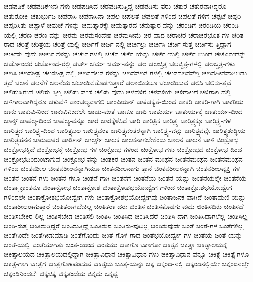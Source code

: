{ಚಡಪಡಿಕೆ
ಚಡಪಡಿಕೆಇವು-ಗಳು
ಚಡಪಡಿಸಿದ
ಚಡಪಡಿಸುತ್ತಿದ್ದ
ಚಡಪಡಿಸು-ವರು
ಚತುರ
ಚತುರನಾಗಿದ್ದರೂ
ಚತುರೋಕ್ತಿ
ಚತುರ್ಭುಜ
ಚಪರಾಸಿ
ಚಪರಾಸಿನಾ
ಚಪಲ
ಚಪಲತೆ
ಚಪಲತೆ-ಗಳಿಂದ
ಚಪಲತೆ-ಗಳಿಗೆ
ಚಪ್ಪಟೆ
ಚಪ್ಪರಿ
ಚಪ್ಪರಿಸಿತು
ಚಪ್ಪಾಳೆ
ಚಮಚೆ-ಗಳನ್ನು
ಚಮತ್ಕಾರಕ್ಕೇ
ಚಮತ್ಕಾರದ
ಚಮತ್ಕಾರ-ವನ್ನು
ಚರಂಡಿಗೆ
ಚರಂಡಿಯ
ಚರಂಡಿ-ಯಲ್ಲಿ
ಚರಣ
ಚರಣ-ವನ್ನು
ಚರಮ
ಚರಮಸಂದೇಶ
ಚರಮಸೀಮೆ
ಚರ-ವಾದ
ಚರಾಚರ
ಚರಾಚರಭೂತ-ಗಳ
ಚರಿತ-ರಾದ
ಚರಿತ್ರೆ
ಚರಿತ್ರೆಯ
ಚರಿತ್ರೆ-ಯಲ್ಲಿ
ಚರ್ಚಿಗೆ
ಚರ್ಚಿ-ನಲ್ಲಿ
ಚರ್ಚಿಲ್ರು
ಚರ್ಚಿಸಿ
ಚರ್ಚಿ-ಸುತ್ತ
ಚರ್ಚಿಸು-ತ್ತಿದ್ದಾಗ
ಚರ್ಚಿಸು-ವುದು
ಚರ್ಚು-ಗಳನ್ನು
ಚರ್ಚು-ಗಳಲ್ಲಿ
ಚರ್ಚೆ
ಚರ್ಚೆ-ಯನ್ನು
ಚರ್ಚೆ-ಯಲ್ಲಿ
ಚರ್ಚೆ-ಯಿಂದ
ಚರ್ಚೊಂದನ್ನು
ಚರ್ಚೊಂದರ
ಚರ್ಚೊಂದ-ರಲ್ಲಿ
ಚರ್ಚ್
ಚರ್ಮ
ಚರ್ಮ-ವನ್ನು
ಚಲ
ಚಲಚ್ಚಿತ್ರ
ಚಲಚ್ಚಿತ್ರ-ಗಳಲ್ಲಿ
ಚಲಚ್ಚಿತ್ರ-ಗಳು
ಚಲತಿ
ಚಲನಚಿತ್ರ
ಚಲನಚಿತ್ರ-ದಲ್ಲಿ
ಚಲನವಲನ-ಗಳನ್ನು
ಚಲನವಲನ-ಗಳಲ್ಲಿ
ಚಲನವಲನವೆಲ್ಲ
ಚಲನಹೀನವಾಗಿಬಿಡು-ತ್ತದೆ
ಚಲನೆ
ಚಲನೆಗೆ
ಚಲನೆಯ
ಚಲಾಯಿಸತೊಡಗುತ್ತಾರೆ
ಚಲಾಯಿಸಲೂ
ಚಲಾಯಿಸುವ
ಚಲಿಸಿ
ಚಲಿಸು-ತ್ತವೆ
ಚಲಿಸುತ್ತಿರುವ
ಚಲಿಸು-ತ್ತಿಲ್ಲ
ಚಲಿಸು-ವಂತೆ
ಚಲಿಸು-ವುದು
ಚಳವಳಿಗೆ
ಚಳವಳಿಯ
ಚಳಿಗಾಲದ
ಚಳಿಗಾಲ-ದಲ್ಲಿ
ಚಳಿಗಾಲವಾಗಿದ್ದರೂ
ಚಳುವಳಿ
ಚಾಂಚಲ್ಯವಾಗಲಿ
ಚಾಂಪಿಯನ್
ಚಾಕಚಕ್ಯತೆ-ಯಿಂದ
ಚಾಕರಿ
ಚಾಕರಿ-ಗಾಗಿ
ಚಾಕರಿಯ
ಚಾಕು
ಚಾಕುವಿ-ನಿಂದ
ಚಾಕುವಿನಿಂದಲೇ
ಚಾಚು-ವಂತೆ
ಚಾಚೂ
ಚಾಡಿ
ಚಾತುರ್ಯ
ಚಾತುರ್ಯಕ್ಕೆ
ಚಾತುರ್ಯ-ದಿಂದ
ಚಾನ್ಸ್
ಚಾಪಲ್ಯ-ದಿಂದ
ಚಾಪಲ್ಯ-ವನ್ನೂ
ಚಾರ
ಚಾರಕ್ಕೆಳೆಸಿದೆ
ಚಾರಿ
ಚಾರಿತ್ರಿಕ
ಚಾರಿತ್ರ್ಯ
ಚಾರಿತ್ರ್ಯಕ್ಕೂ
ಚಾರಿತ್ರ್ಯ-ಗಳ
ಚಾರಿತ್ರ್ಯದ
ಚಾರಿತ್ರ್ಯ-ದಿಂದ
ಚಾರಿತ್ರ್ಯಬಲ
ಚಾರಿತ್ರ್ಯವಂತ
ಚಾರಿತ್ರ್ಯವಂತರನ್ನಾಗಿ
ಚಾರಿತ್ರ್ಯ-ವನ್ನು
ಚಾರಿತ್ರ್ಯವನ್ನೇ
ಚಾರಿತ್ರ್ಯಶುದ್ಧಿಯ
ಚಾರಿತ್ರ್ಯಹನನ
ಚಾರುವಾಕರ
ಚಾರ್ಡಿನ್
ಚಾರ್ಲ್ಸ್
ಚಾಲಕ
ಚಾಲಕನಾಗಬೇಕೆಂದು
ಚಾಲನ
ಚಾಲನೆ
ಚಾಳಿ
ಚಿಂಕ್ರೋಭ
ಚಿಂಕ್ರೋಭಕ್ಕಿದೆ
ಚಿಂಕ್ರೋಭಕ್ಕೆ
ಚಿಂಕ್ರೋಭ-ಗಳ
ಚಿಂಕ್ರೋಭ-ಗಳಿಂದ
ಚಿಂಕ್ರೋಭ-ಗಳು
ಚಿಂಕ್ರೋಭದ
ಚಿಂಕ್ರೋಭ-ದಿಂದ
ಚಿಂಕ್ರೋಭದಿಂದುಂಟಾಗುವ
ಚಿಂಕ್ರೋಭ-ವನ್ನು
ಚಿಂತಕರ
ಚಿಂತನ
ಚಿಂತನ-ಮಂಥನ
ಚಿಂತನಮಂಥನ
ಚಿಂತನಮಂಥನ-ಗಳಿಂದ
ಚಿಂತನಶೀಲ
ಚಿಂತನಶೀಲನನ್ನಾಗಿಯೂ
ಚಿಂತನಶೀಲನಾಗು-ತ್ತಾನೆ
ಚಿಂತನಶೀಲರನ್ನಾಗಿ
ಚಿಂತನಶೀಲವ್ಯಕ್ತಿ-ಗಳ
ಚಿಂತನೆ
ಚಿಂತನೆ-ಗಳು
ಚಿಂತನೆ-ಗಳೂ
ಚಿಂತನೆ-ಗಾಗಿ
ಚಿಂತನೆಗೆ
ಚಿಂತನೆಯ
ಚಿಂತನೆ-ಯನ್ನು
ಚಿಂತನೆಯಲ್ಲೇ
ಚಿಂತನೆಯೆ
ಚಿಂತಾ-ಕ್ರಾಂತನೂ
ಚಿಂತಾಕ್ರೋಭ
ಚಿಂತಾಕ್ರೋಶ
ಚಿಂತಾಕ್ರೋಶಭಯೋದ್ವೇಗ-ಗಳಿಂದ
ಚಿಂತಾಕ್ರೋಶಭಯೋದ್ವೇಗ-ಗಳಿಂದಲೇ
ಚಿಂತಾಕ್ರೋಶಭಯೋದ್ವೇಗ-ಗಳು
ಚಿಂತಾಕ್ರೋಶಭಯೋದ್ವೇಗವು
ಚಿಂತಾಜನಕ-ವಾಗಿದೆ
ಚಿಂತಾಮಣಿ-ಯನ್ನು
ಚಿಂತಾಶೀಲರಾಗುತ್ತಾರೆ
ಚಿಂತಿತರಾಗಬೇಕಿಲ್ಲ
ಚಿಂತಿತರಾ-ದರು
ಚಿಂತಿಸ
ಚಿಂತಿಸತೊಡಗು-ವುದು
ಚಿಂತಿಸದಿರು
ಚಿಂತಿಸದೆ
ಚಿಂತಿಸಬೇಕಿರ-ಲಿಲ್ಲ
ಚಿಂತಿಸಬೇಡ
ಚಿಂತಿಸಲಿ
ಚಿಂತಿಸಿ
ಚಿಂತಿಸಿದ
ಚಿಂತಿಸಿದರೆ
ಚಿಂತಿಸಿ-ದಾಗ
ಚಿಂತಿಸಿದಾಗಲೆಲ್ಲ
ಚಿಂತಿಸಿಲ್ಲ
ಚಿಂತಿ-ಸುತ್ತ
ಚಿಂತಿಸುತ್ತಿದ್ದರೆ
ಚಿಂತಿಸುತ್ತಿದ್ದೆ
ಚಿಂತಿಸುವ
ಚಿಂತಿಸು-ವುದಿಲ್ಲ
ಚಿಂತಿಸುವುದೇ
ಚಿಂತೆ
ಚಿಂತೆ-ಗಳ
ಚಿಂತೆಗಳಿಲ್ಲ
ಚಿಂತೆಗಿಂದೇ
ಚಿಂತೆಗೀಡುಮಾಡಿ
ಚಿಂತೆಗೊಂದು
ಚಿಂತೆ-ಗೊಳ-ಗಾದ
ಚಿಂತೆಭಯೋದ್ವೇಗ-ಗಳ
ಚಿಂತೆಯ
ಚಿಂತೆ-ಯನ್ನು
ಚಿಂತೆ-ಯಲ್ಲಿ
ಚಿಂತೆಯಾಗಿತ್ತು
ಚಿಂತೆ-ಯಿಂದ
ಚಿಂತೆಯು
ಚಿಕಾಗೊ
ಚಿಕಾಗೋ
ಚಿಕಿತ್ಸಕ
ಚಿಕಿತ್ಸಾ
ಚಿಕಿತ್ಸಾಲಯಕ್ಕೆ
ಚಿಕಿತ್ಸಾಲಯದ
ಚಿಕಿತ್ಸಾಲಯದಲ್ಲಿದ್ದಾಗ
ಚಿಕಿತ್ಸಾವಿಧಾನ
ಚಿಕಿತ್ಸಾವಿಧಾನ-ಗಳು
ಚಿಕಿತ್ಸಾವಿಧಾನ-ವನ್ನೂ
ಚಿಕಿತ್ಸೆ
ಚಿಕಿತ್ಸೆ-ಗಳೂ
ಚಿಕಿತ್ಸೆ-ಗಾಗಿ
ಚಿಕಿತ್ಸೆಗೆ
ಚಿಕಿತ್ಸೆಗೊಳಪಡಿಸುವ
ಚಿಕಿತ್ಸೆಯ
ಚಿಕಿತ್ಸೆ-ಯನ್ನು
ಚಿಕ್ಕ
ಚಿಕ್ಕಂದಿ-ನಲ್ಲಿ
ಚಿಕ್ಕಂದಿನಲ್ಲಿಯೇ
ಚಿಕ್ಕಂದಿನಲ್ಲೇ
ಚಿಕ್ಕಂದಿನಿಂದಲೇ
ಚಿಕ್ಕಚಿಕ್ಕ
ಚಿಕ್ಕತಂದೆಯ
ಚಿಕ್ಕದು
ಚಿಕ್ಕಪ್ಪ
}
